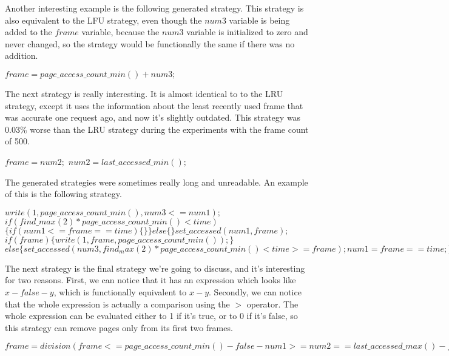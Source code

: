 \medskip

Another interesting example is the following generated strategy. This strategy is also equivalent to the LFU strategy, even though the $num3$ variable is being added to the $frame$ variable, because the $num3$ variable is initialized to zero and never changed, so the strategy would be functionally the same if there was no addition.
\noindent
\begin{algorithmic}
\State $ frame=page\_access\_count\_min()+num3;$
\end{algorithmic}

\newpage

The next strategy is really interesting. It is almost identical to to the LRU strategy, except it uses the information about the least recently used frame that was accurate one request ago, and now it's slightly outdated. This strategy was 0.03\% worse than the LRU strategy during the experiments with the frame count of 500.
\noindent
\begin{algorithmic}
\State $ frame=num2;$
\State $ num2=last\_accessed\_min();$
\end{algorithmic}

\medskip

The generated strategies were sometimes really long and unreadable. An example of this is the following strategy.
\noindent
\begin{algorithmic}
\State $ write(1,page\_access\_count\_min(),num3<=num1);$
\State $ if(find\_max(2)*page\_access\_count\_min()<time)$
\State $\{if(num1<=frame==time)\{\}\}else\{\} set\_accessed(num1,frame);$ \State $if(frame)
\{write(1,frame,page\_access\_count\_min());\}$
\State $else\{set\_accessed(num3,find_max(2) * page\_access\_count\_min()<time>=frame);num1=frame==time;\}$
\end{algorithmic}

\medskip

The next strategy is the final strategy we're going to discuss, and it's interesting for two reasons. First, we can notice that it has an expression which looks like $x - false - y$, which is functionally equivalent to $x - y$. Secondly, we can notice that the whole expression is actually a comparison using the $>$ operator. The whole expression can be evaluated either to 1 if it's true, or to 0 if it's false, so this strategy can remove pages only from its first two frames.
\noindent
\begin{algorithmic}
\State $ frame=division(frame<=page\_access\_count\_min()-false-num1>=num2==last\_accessed\_max()-frame>frame>=frame,time)>page\_access\_count\_min();$\end{algorithmic}
